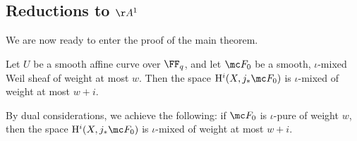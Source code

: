 \documentclass[../notes.tex]{subfiles}
\begin{document}
\subsection{Reductions to \texorpdfstring{$\AA^1$}{ A1}}
We are now ready to enter the proof of the main theorem.
\begin{theorem}
	Let $U$ be a smooth affine curve over $\FF_q$, and let $\mc F_0$ be a smooth, $\iota$-mixed Weil sheaf of weight at most $w$. Then the space $\mathrm H^i(X,j_*\mc F_0)$ is $\iota$-mixed of weight at most $w+i$.
\end{theorem}
\begin{remark}
	By dual considerations, we achieve the following: if $\mc F_0$ is $\iota$-pure of weight $w$, then the space $\mathrm H^i(X,j_*\mc F_0)$ is $\iota$-mixed of weight at most $w+i$.
\end{remark}
\end{document}
